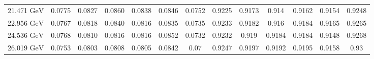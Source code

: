 \documentclass[11pt]{article}
\begin{document}
\begin{table}[htbp]
{\begin{tabular}{ccccccccccccc}
				21.471 ${\textrm{GeV}}$ & 0.0775 & 0.0827 & 0.0860 & 0.0838 & 0.0846 & 0.0752  & 0.9225 & 0.9173 & 0.914 & 0.9162 & 0.9154 & 0.9248  \\
				22.956 ${\textrm{GeV}}$ & 0.0767 & 0.0818 & 0.0840 & 0.0816 & 0.0835 & 0.0735  & 0.9233 & 0.9182 & 0.916 & 0.9184 & 0.9165 & 0.9265  \\
				24.536 ${\textrm{GeV}}$ & 0.0768 & 0.0810 & 0.0816 & 0.0816 & 0.0852 & 0.0732  & 0.9232 & 0.919 & 0.9184 & 0.9184 & 0.9148 & 0.9268  \\
				26.019 ${\textrm{GeV}}$ & 0.0753 & 0.0803 & 0.0808 & 0.0805 & 0.0842 & 0.07  & 0.9247 & 0.9197 & 0.9192 & 0.9195 & 0.9158 & 0.93  \\
				\bottomrule
				\bottomrule
			\end{tabular}
}
\end{table}
\end{document}

